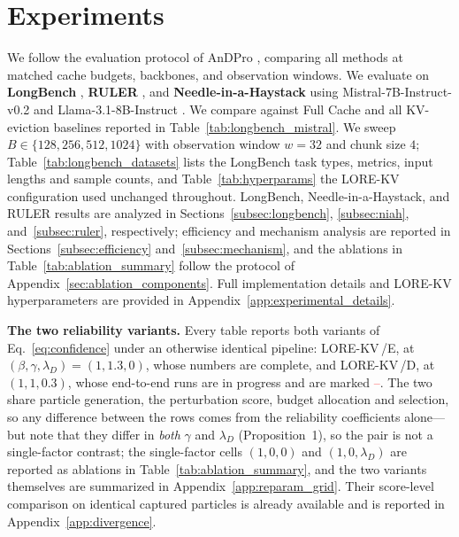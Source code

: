 \documentclass{article} %
\newcommand{\tbd}{\textcolor{red}{--}}
\newcommand{\lorekvE}{LORE-KV\,/E}
\newcommand{\lorekvD}{LORE-KV\,/D}
\begin{document}
\section{Experiments} \label{subsec:setup}
We follow the evaluation protocol of AnDPro \citep{geng2026accurate}, comparing all methods at matched cache budgets, backbones, and observation windows. We evaluate on \textbf{LongBench} \citep{bai2024longbench}, \textbf{RULER} \citep{hsieh2024ruler}, and \textbf{Needle-in-a-Haystack} \citep{kamradt2023needle} using Mistral-7B-Instruct-v0.2 \citep{jiang2023mistral} and Llama-3.1-8B-Instruct \citep{dubey2024llama}. We compare against Full Cache and all KV-eviction baselines reported in Table~\ref{tab:longbench_mistral}. We sweep $B\in\{128,256,512,1024\}$ with observation window $w=32$ and chunk size $4$; Table~\ref{tab:longbench_datasets} lists the LongBench task types, metrics, input lengths and sample counts, and Table~\ref{tab:hyperparams} the LORE-KV configuration used unchanged throughout. LongBench, Needle-in-a-Haystack, and RULER results are analyzed in Sections~\ref{subsec:longbench}, \ref{subsec:niah}, and~\ref{subsec:ruler}, respectively; efficiency and mechanism analysis are reported in Sections~\ref{subsec:efficiency} and~\ref{subsec:mechanism}, and the ablations in Table~\ref{tab:ablation_summary} follow the protocol of Appendix~\ref{sec:ablation_components}. Full implementation details and LORE-KV hyperparameters are provided in Appendix~\ref{app:experimental_details}.

\textbf{The two reliability variants.} Every table reports both variants of Eq.~\eqref{eq:confidence} under an otherwise identical pipeline: \lorekvE, at $(\beta,\gamma,\lambda_D)=(1,1.3,0)$, whose numbers are complete, and \lorekvD, at $(1,1,0.3)$, whose end-to-end runs are in progress and are marked \tbd. The two share particle generation, the perturbation score, budget allocation and selection, so any difference between the rows comes from the reliability coefficients alone---but note that they differ in \emph{both} $\gamma$ and $\lambda_D$ (Proposition~1), so the pair is not a single-factor contrast; the single-factor cells $(1,0,0)$ and $(1,0,\lambda_D)$ are reported as ablations in Table~\ref{tab:ablation_summary}, and the two variants themselves are summarized in Appendix~\ref{app:reparam_grid}. Their score-level comparison on identical captured particles is already available and is reported in Appendix~\ref{app:divergence}.
\end{document}
